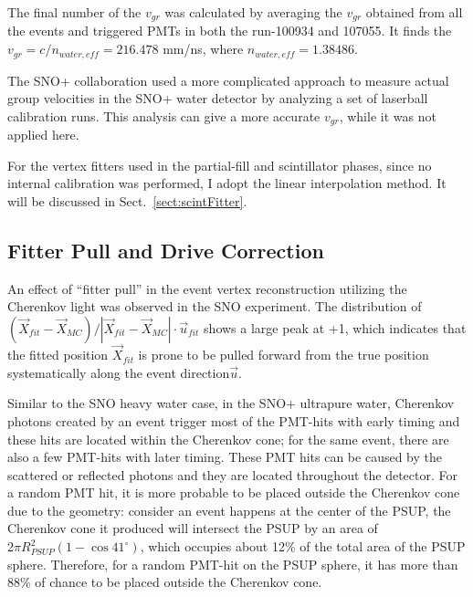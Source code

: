 The final number of the $v_{gr}$ was calculated by averaging the $v_{gr}$ obtained from all the events and triggered PMTs in both the run-100934 and 107055. It finds the $v_{gr}=c/n_{water,eff}=216.478$ mm/ns, where $n_{water,eff}=1.38486$.

The SNO+ collaboration used a more complicated approach to measure actual group velocities in the SNO+ water detector by analyzing a set of laserball calibration runs\cite{groupVmeasure,anderson2021optical}. This analysis can give a more accurate $v_{gr}$, while it was not applied here.

For the vertex fitters used in the partial-fill and scintillator phases, since no internal calibration was performed, I adopt the linear interpolation method. It will be discussed in Sect.~\ref{sect:scintFitter}.

\subsection{Fitter Pull and Drive Correction}\label{sect:fitterPull}

An effect of ``fitter pull'' in the event vertex reconstruction utilizing the Cherenkov light was observed in the SNO experiment. The distribution of $(\vec{X}_{fit}-\vec{X}_{MC})/|\vec{X}_{fit}-\vec{X}_{MC}|\cdot \vec{u}_{fit}$ shows a large peak at +1, which indicates that the fitted position $\vec{X}_{fit}$ is prone to be pulled forward from the true position systematically along the event direction$\vec{u}$\cite{driveCorPeter,brice1996monte,coulter2013modelling}. 

Similar to the SNO heavy water case, in the SNO+ ultrapure water, Cherenkov photons created by an event trigger most of the PMT-hits with early timing and these hits are located within the Cherenkov cone; for the same event, there are also a few PMT-hits with later timing. These PMT hits can be caused by the scattered or reflected photons and they are located throughout the detector. For a random PMT hit, it is more probable to be placed outside the Cherenkov cone due to the geometry: consider an event happens at the center of the PSUP, the Cherenkov cone it produced will intersect the PSUP by an area of $2\pi R^2_{PSUP}(1-\cos41^\circ)$, which occupies about 12\% of the total area of the PSUP sphere. Therefore, for a random PMT-hit on the PSUP sphere, it has more than 88\% of chance to be placed outside the Cherenkov cone. 

